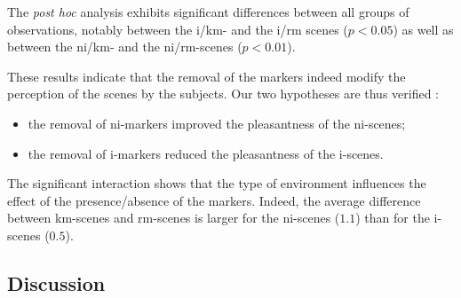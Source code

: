 \documentclass[12pt]{elsarticle}
\begin{document}
The \emph{post hoc} analysis exhibits significant differences between all groups of observations, notably between the i/km- and the i/rm scenes ($p<0.05$) as well as between the ni/km- and the ni/rm-scenes ($p<0.01$).


These results indicate that the removal of the markers indeed modify the perception of the scenes by the subjects. Our two hypotheses are thus verified :


\begin{itemize}
\item the removal of ni-markers improved the pleasantness of the ni-scenes;
\item the removal of i-markers reduced the pleasantness of the i-scenes.
\end{itemize}


The significant interaction shows that the type of environment influences the effect of the presence/absence of the markers. Indeed, the average difference between km-scenes and rm-scenes is larger for the ni-scenes ($1.1$) than for the i-scenes ($0.5$).

\subsection{Discussion}

\end{document}
